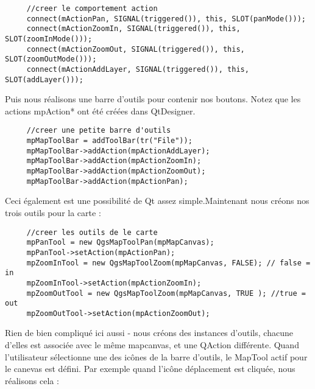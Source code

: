 \begin{verbatim}
     //creer le comportement action
     connect(mActionPan, SIGNAL(triggered()), this, SLOT(panMode()));
     connect(mActionZoomIn, SIGNAL(triggered()), this, SLOT(zoomInMode()));
     connect(mActionZoomOut, SIGNAL(triggered()), this, SLOT(zoomOutMode()));
     connect(mActionAddLayer, SIGNAL(triggered()), this, SLOT(addLayer()));
\end{verbatim}

Puis nous r\'ealisons une barre d'outils pour contenir nos boutons. Notez que les 
actions mpAction* ont \'et\'e cr\'e\'ees dans QtDesigner.

\begin{verbatim}
     //creer une petite barre d'outils
     mpMapToolBar = addToolBar(tr("File"));
     mpMapToolBar->addAction(mpActionAddLayer);
     mpMapToolBar->addAction(mpActionZoomIn);
     mpMapToolBar->addAction(mpActionZoomOut);
     mpMapToolBar->addAction(mpActionPan);
\end{verbatim}

Ceci \'egalement est une possibilit\'e de Qt assez simple.Maintenant nous cr\'eons 
nos trois outils pour la carte :

\begin{verbatim}
     //creer les outils de le carte
     mpPanTool = new QgsMapToolPan(mpMapCanvas);
     mpPanTool->setAction(mpActionPan);
     mpZoomInTool = new QgsMapToolZoom(mpMapCanvas, FALSE); // false = in
     mpZoomInTool->setAction(mpActionZoomIn);
     mpZoomOutTool = new QgsMapToolZoom(mpMapCanvas, TRUE ); //true = out
     mpZoomOutTool->setAction(mpActionZoomOut);
\end{verbatim}

Rien de bien compliqu\'e ici aussi - nous cr\'eons des instances d'outils, chacune 
d'elles est associ\'ee avec le m\^eme mapcanvas, et une QAction diff\'erente. Quand 
l'utilisateur s\'electionne une des ic\^ones de la barre d'outils, le MapTool actif 
pour le canevas est d\'efini. Par exemple quand l'ic\^one d\'eplacement est cliqu\'ee, 
nous r\'ealisons cela :

